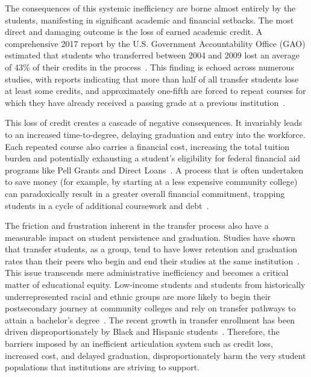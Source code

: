 The consequences of this systemic inefficiency are borne almost entirely by the students, manifesting in significant academic and financial setbacks. The most direct and damaging outcome is the loss of earned academic credit. A comprehensive 2017 report by the U.S. Government Accountability Office (GAO) estimated that students who transferred between 2004 and 2009 lost an average of 43\% of their credits in the process~\cite{gao2017}. This finding is echoed across numerous studies, with reports indicating that more than half of all transfer students lose at least some credits, and approximately one-fifth are forced to repeat courses for which they have already received a passing grade at a previous institution~\cite{publicagenda2025}.

This loss of credit creates a cascade of negative consequences. It invariably leads to an increased time-to-degree, delaying graduation and entry into the workforce. Each repeated course also carries a financial cost, increasing the total tuition burden and potentially exhausting a student's eligibility for federal financial aid programs like Pell Grants and Direct Loans~\cite{gao2017}. A process that is often undertaken to save money (for example, by starting at a less expensive community college) can paradoxically result in a greater overall financial commitment, trapping students in a cycle of additional coursework and debt~\cite{collegeopportunity2017}.

The friction and frustration inherent in the transfer process also have a measurable impact on student persistence and graduation. Studies have shown that transfer students, as a group, tend to have lower retention and graduation rates than their peers who begin and end their studies at the same institution~\cite{porter1999}. This issue transcends mere administrative inefficiency and becomes a critical matter of educational equity. Low-income students and students from historically underrepresented racial and ethnic groups are more likely to begin their postsecondary journey at community colleges and rely on transfer pathways to attain a bachelor's degree~\cite{ace2025}. The recent growth in transfer enrollment has been driven disproportionately by Black and Hispanic students~\cite{nscnews2023}. Therefore, the barriers imposed by an inefficient articulation system such as credit loss, increased cost, and delayed graduation, disproportionately harm the very student populations that institutions are striving to support.

